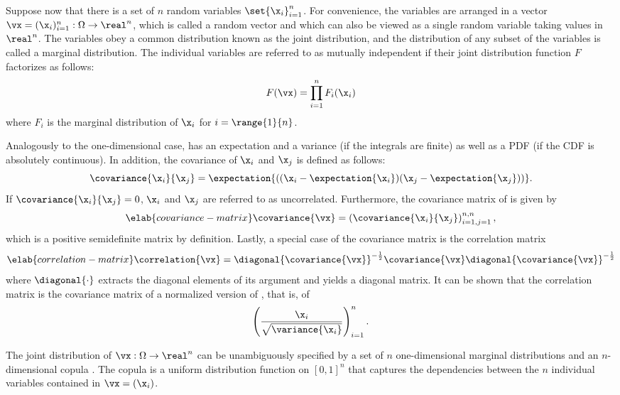 Suppose now that there is a set of $n$ random variables $\set{\x_i}_{i = 1}^n$.
For convenience, the variables are arranged in a vector $\vx = (\x_i)_{i = 1}^n:
\Omega \to \real^n$, which is called a random vector and which can also be
viewed as a single random variable taking values in $\real^n$. The variables
obey a common distribution known as the joint distribution, and the distribution
of any subset of the variables is called a marginal distribution. The individual
variables are referred to as mutually independent if their joint distribution
function $F$ factorizes as follows:
\[
  F(\vx) = \prod_{i = 1}^n F_i(\x_i)
\]
where $F_i$ is the marginal distribution of $\x_i$ for $i = \range{1}{n}$.

Analogously to the one-dimensional case, \vx has an expectation and a variance
(if the integrals are finite) as well as a \ac{PDF} (if the \ac{CDF} is
absolutely continuous). In addition, the covariance of $\x_i$ and $\x_j$ is
defined as follows:
\[
  \covariance{\x_i}{\x_j} = \expectation{((\x_i - \expectation{\x_i})(\x_j - \expectation{\x_j}))}.
\]
If $\covariance{\x_i}{\x_j} = 0$, $\x_i$ and $\x_j$ are referred to as
uncorrelated. Furthermore, the covariance matrix of \vx is given by
\begin{equation} \elab{covariance-matrix}
  \covariance{\vx} = \left(\covariance{\x_i}{\x_j}\right)_{i = 1, j = 1}^{n, n},
\end{equation}
which is a positive semidefinite matrix by definition. Lastly, a special case of
the covariance matrix is the correlation matrix
\begin{equation} \elab{correlation-matrix}
  \correlation{\vx} = \diagonal{\covariance{\vx}}^{-\frac{1}{2}} \covariance{\vx} \diagonal{\covariance{\vx}}^{-\frac{1}{2}}
\end{equation}
where $\diagonal{\cdot}$ extracts the diagonal elements of its argument and
yields a diagonal matrix. It can be shown that the correlation matrix is the
covariance matrix of a normalized version of \vx, that is, of
\[
  \left(\frac{\x_i}{\sqrt{\variance{\x_i}}}\right)_{i = 1}^n.
\]

The joint distribution of $\vx: \Omega \to \real^n$ can be unambiguously
specified by a set of $n$ one-dimensional marginal distributions and an
$n$-dimensional copula \cite{nelsen2006}. The copula is a uniform distribution
function on $[0, 1]^n$ that captures the dependencies between the $n$ individual
variables contained in $\vx = (\x_i)$.
